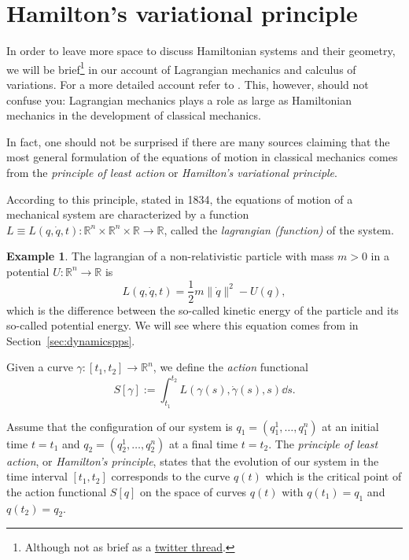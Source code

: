\documentclass[english,fontsize=11pt,paper=b5]{scrbook}
\theoremstyle{definition}
\newtheorem{example}{Example}[chapter]
\begin{document}
  \section{Hamilton's variational principle}\label{sec:varpri}

  In order to leave more space to discuss Hamiltonian systems and their geometry, we will be brief\footnote{Although not as brief as a \href{https://twitter.com/j\_bertolotti/status/1397159397596581889}{twitter thread}.} in our account of Lagrangian mechanics and calculus of variations. For a more detailed account refer to \cite[Part II]{book:arnold}.
  This, however, should not confuse you: Lagrangian mechanics plays a role as large as Hamiltonian mechanics in the development of classical mechanics.

  In fact, one should not be surprised if there are many sources claiming that the most general formulation of the equations of motion in classical mechanics comes from the \emph{principle of least action} or \emph{Hamilton's variational principle}.

  According to this principle, stated in 1834, the equations of motion of a mechanical system are characterized by a function $L \equiv L(q, \dot q, t) : \mathbb{R}^n \times \mathbb{R}^n \times \mathbb{R} \to \mathbb{R}$, called the \emph{lagrangian (function)} of the system.

  \begin{example}
    The lagrangian of a non-relativistic particle with mass $m > 0$ in a potential $U : \mathbb{R}^n \to \mathbb{R}$ is
    \begin{equation}
      L(q, \dot q, t) = \frac12 m \|\dot q\|^2 - U(q),
    \end{equation}
    which is the difference between the so-called kinetic energy of the particle and its so-called potential energy.
    We will see where this equation comes from in Section~\ref{sec:dynamicspps}.
  \end{example}

  Given a curve $\gamma:[t_1, t_2] \to \mathbb{R}^n$, we define the \emph{action} functional
  \begin{equation}\label{eq:Laction}
    S[\gamma] := \int_{t_1}^{t_2} L(\gamma(s), \dot \gamma(s), s) \dd s.
  \end{equation}

  \begin{tcolorbox}
    Assume that the configuration of our system is $q_1 = (q_1^1, \ldots, q_1^n)$ at an initial time $t=t_1$ and $q_2 = (q_2^1, \ldots, q_2^n)$ at a final time $t = t_2$. The \emph{principle of least action}, or \emph{Hamilton's principle}, states that the evolution of our system in the time interval $[t_1, t_2]$ corresponds to the curve $q(t)$ which is the critical point of the action functional $S[q]$ on the space of curves $q(t)$ with $q(t_1) = q_1$ and $q(t_2) = q_2$.
  \end{tcolorbox}
\end{document}
